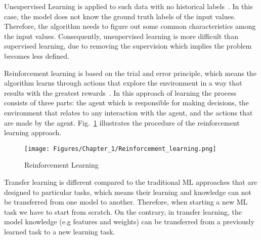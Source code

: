 Unsupervised Learning is applied to such data with no historical labels~\cite{Ongsulee2018}. 
In this case, the model does not know the ground truth labels of the input values. Therefore, the algorithm needs to figure out some common characteristics among the input values.
Consequently, unsupervised learning is more difficult than supervised learning, due to removing the supervision which implies the problem becomes less defined.

Reinforcement learning is based on the trial and error principle, which means the algorithm learns through actions that explore the environment in a way that results with the greatest rewards~\cite{Russell2010}.
In this approach of learning the process consists of three parts: the agent which is responsible for making decisions, the environment that relates to any interaction with the agent, and the actions that are made by the agent. Fig.~\ref{fig:ReinforcementLearning} illustrates the procedure of the reinforcement learning approach.
\begin{figure} [!ht]
	\begin{center}
		\centering
		\texttt{[image: Figures/Chapter\_1/Reinforcement\_learning.png]}
	\end{center}
	\caption{Reinforcement Learning} 
	\label{fig:ReinforcementLearning}
\end{figure}

Transfer learning is different compared to the traditional ML approaches that are designed to particular tasks, which means their learning and knowledge can not be transferred from one model to another.
Therefore, when starting a new ML task we have to start from scratch.
On the contrary, in transfer learning, the model knowledge (e.g features and weights) can be transferred from a previously learned task to a new learning task.
